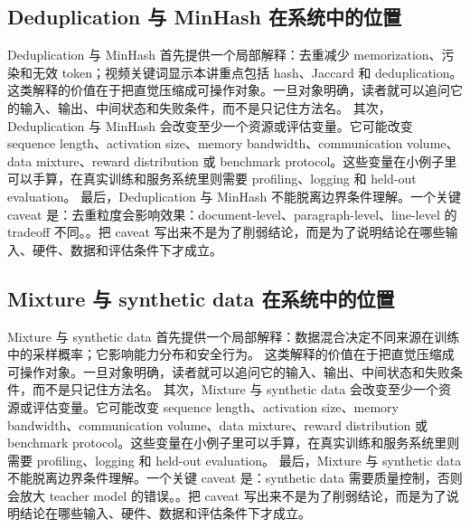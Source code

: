 \documentclass[a4paper]{article}
\begin{document}
\subsection{Deduplication 与 MinHash 在系统中的位置}
Deduplication 与 MinHash 首先提供一个局部解释：去重减少 memorization、污染和无效 token；视频关键词显示本讲重点包括 hash、Jaccard 和 deduplication。 这类解释的价值在于把直觉压缩成可操作对象。一旦对象明确，读者就可以追问它的输入、输出、中间状态和失败条件，而不是只记住方法名。
其次，Deduplication 与 MinHash 会改变至少一个资源或评估变量。它可能改变 sequence length、activation size、memory bandwidth、communication volume、data mixture、reward distribution 或 benchmark protocol。这些变量在小例子里可以手算，在真实训练和服务系统里则需要 profiling、logging 和 held-out evaluation。
最后，Deduplication 与 MinHash 不能脱离边界条件理解。一个关键 caveat 是：去重粒度会影响效果：document-level、paragraph-level、line-level 的 tradeoff 不同。。把 caveat 写出来不是为了削弱结论，而是为了说明结论在哪些输入、硬件、数据和评估条件下才成立。
\subsection{Mixture 与 synthetic data 在系统中的位置}
Mixture 与 synthetic data 首先提供一个局部解释：数据混合决定不同来源在训练中的采样概率；它影响能力分布和安全行为。 这类解释的价值在于把直觉压缩成可操作对象。一旦对象明确，读者就可以追问它的输入、输出、中间状态和失败条件，而不是只记住方法名。
其次，Mixture 与 synthetic data 会改变至少一个资源或评估变量。它可能改变 sequence length、activation size、memory bandwidth、communication volume、data mixture、reward distribution 或 benchmark protocol。这些变量在小例子里可以手算，在真实训练和服务系统里则需要 profiling、logging 和 held-out evaluation。
最后，Mixture 与 synthetic data 不能脱离边界条件理解。一个关键 caveat 是：synthetic data 需要质量控制，否则会放大 teacher model 的错误。。把 caveat 写出来不是为了削弱结论，而是为了说明结论在哪些输入、硬件、数据和评估条件下才成立。
\end{document}
